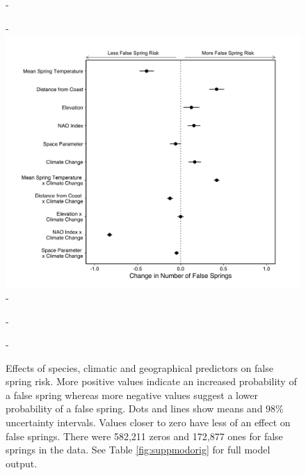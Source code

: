 \documentclass{article}\usepackage[]{graphicx}\usepackage[]{color}
\begin{document}
  
{\begin{figure} [H]
  -\begin{center}
  -\includegraphics[width=12cm]{..//analyses/figures/model_output_98_orig.png}
  -\caption{Effects of species, climatic and geographical predictors on false spring risk. More positive values indicate an increased probability of a false spring whereas more negative values suggest a lower probability of a false spring. Dots and lines show means and 98\% uncertainty intervals. Values closer to zero have less of an effect on false springs. There were 582,211 zeros and 172,877 ones for false springs in the data. See Table \ref{fig:suppmodorig} for full model output.}\label{fig:maineffects}
  -\end{center}
  -\end{figure}}
  
\end{document}
